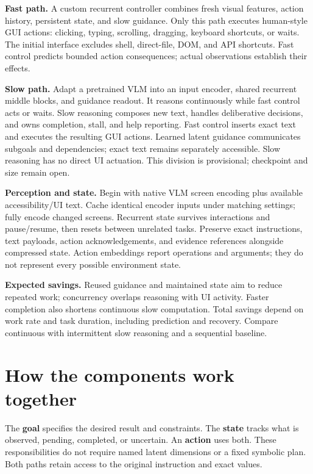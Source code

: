 \documentclass[11pt,letterpaper]{article}
\begin{document}
\textbf{Fast path.} A custom recurrent controller combines fresh visual features, action history, persistent state, and slow guidance. Only this path executes human-style GUI actions: clicking, typing, scrolling, dragging, keyboard shortcuts, or waits. The initial interface excludes shell, direct-file, DOM, and API shortcuts. Fast control predicts bounded action consequences; actual observations establish their effects.

\textbf{Slow path.} Adapt a pretrained VLM into an input encoder, shared recurrent middle blocks, and guidance readout. It reasons continuously while fast control acts or waits. Slow reasoning composes new text, handles deliberative decisions, and owns completion, stall, and help reporting. Fast control inserts exact text and executes the resulting GUI actions. Learned latent guidance communicates subgoals and dependencies; exact text remains separately accessible. Slow reasoning has no direct UI actuation. This division is provisional; checkpoint and size remain open.

\textbf{Perception and state.} Begin with native VLM screen encoding plus available accessibility/UI text. Cache identical encoder inputs under matching settings; fully encode changed screens. Recurrent state survives interactions and pause/resume, then resets between unrelated tasks. Preserve exact instructions, text payloads, action acknowledgements, and evidence references alongside compressed state. Action embeddings report operations and arguments; they do not represent every possible environment state.

\textbf{Expected savings.} Reused guidance and maintained state aim to reduce repeated work; concurrency overlaps reasoning with UI activity. Faster completion also shortens continuous slow computation. Total savings depend on work rate and task duration, including prediction and recovery. Compare continuous with intermittent slow reasoning and a sequential baseline.

\clearpage
\section{How the components work together}
The \textbf{goal} specifies the desired result and constraints. The \textbf{state} tracks what is observed, pending, completed, or uncertain. An \textbf{action} uses both. These responsibilities do not require named latent dimensions or a fixed symbolic plan. Both paths retain access to the original instruction and exact values.
\end{document}
